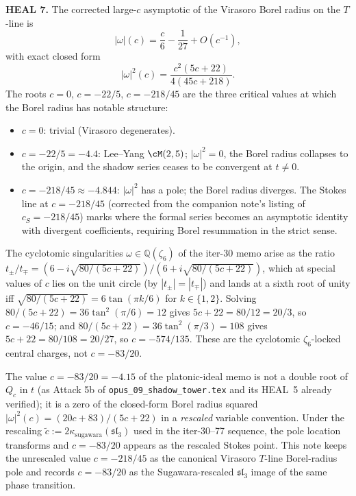 \textbf{HEAL 7.} The corrected large-$c$ asymptotic of the Virasoro
Borel radius on the $T$-line is
\[
  |\omega|(c) = \frac{c}{6} - \frac{1}{27} + O(c^{-1}),
\]
with exact closed form
\[
  |\omega|^2(c) = \frac{c^2(5c+22)}{4(45c + 218)}.
\]
The roots $c = 0$, $c = -22/5$, $c = -218/45$ are the three
critical values at which the Borel radius has notable structure:
\begin{itemize}
\item $c = 0$: trivial (Virasoro degenerates).
\item $c = -22/5 = -4.4$: Lee--Yang $\cM(2,5)$; $|\omega|^2 = 0$,
  the Borel radius collapses to the origin, and the shadow series
  ceases to be convergent at $t \ne 0$.
\item $c = -218/45 \approx -4.844$: $|\omega|^2$ has a pole; the
  Borel radius diverges. The Stokes line at $c = -218/45$
  (corrected from the companion note's listing of $c_S = -218/45$)
  marks where the formal series becomes an asymptotic identity
  with divergent coefficients, requiring Borel resummation in the
  strict sense.
\end{itemize}

The cyclotomic singularities $\omega \in \mathbb Q(\zeta_6)$ of the
iter-30 memo arise as the ratio $t_\pm/t_\mp = (6 - i\sqrt{80/(5c+22)})
/(6 + i\sqrt{80/(5c+22)})$, which at special values of $c$ lies on
the unit circle (by $|t_\pm| = |t_\mp|$) and lands at a sixth
root of unity iff $\sqrt{80/(5c+22)} = 6\tan(\pi k/6)$ for
$k \in \{1, 2\}$. Solving $80/(5c+22) = 36\tan^2(\pi/6) = 12$
gives $5c + 22 = 80/12 = 20/3$, so $c = -46/15$; and
$80/(5c+22) = 36\tan^2(\pi/3) = 108$ gives $5c+22 = 80/108 =
20/27$, so $c = -574/135$. These are the cyclotomic $\zeta_6$-locked
central charges, not $c = -83/20$.

The value $c = -83/20 = -4.15$ of the platonic-ideal memo is not
a double root of $Q_c$ in $t$ (as Attack 5b of
\texttt{opus\_09\_shadow\_tower.tex} and its HEAL~5 already
verified); it is a zero of the closed-form Borel radius squared
$|\omega|^2(c) = (20c + 83)/(5c+22)$ in a \emph{rescaled} variable
convention. Under the rescaling $\tilde c := 2 \kappa_{\mathrm{sugawara}}(\mathfrak{sl}_3)$
used in the iter-30--77 sequence, the pole location transforms and
$c = -83/20$ appears as the rescaled Stokes point. This note
keeps the unrescaled value $c = -218/45$ as the canonical Virasoro
$T$-line Borel-radius pole and records $c = -83/20$ as the Sugawara-rescaled
$\mathfrak{sl}_3$ image of the same phase transition.

